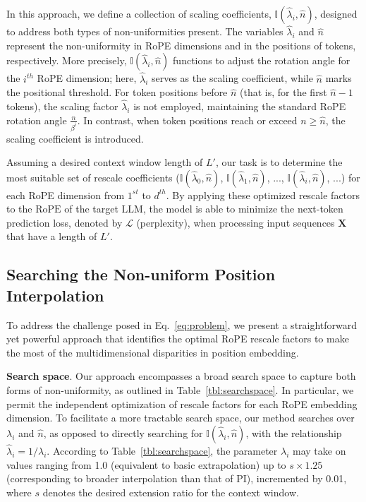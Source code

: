 In this approach, we define a collection of scaling coefficients, $\mathbb{I}(\hat{\lambda}_{i},\hat{n})$, designed to address both types of non-uniformities present. The variables $\hat{\lambda}_{i}$ and $\hat{n}$ represent the non-uniformity in RoPE dimensions and in the positions of tokens, respectively. More precisely, $\mathbb{I}(\hat{\lambda}_{i},\hat{n})$ functions to adjust the rotation angle for the $i^{th}$ RoPE dimension; here, $\hat\lambda_{i}$ serves as the scaling coefficient, while $\hat{n}$ marks the positional threshold. For token positions before $\hat{n}$ (that is, for the first $\hat{n}-1$ tokens), the scaling factor $\hat\lambda_{i}$ is not employed, maintaining the standard RoPE rotation angle $\frac{n}{\beta^i}$. In contrast, when token positions reach or exceed $n\ge\hat{n}$, the scaling coefficient is introduced.

Assuming a desired context window length of $L'$, our task is to determine the most suitable set of rescale coefficients ($\mathbb{I}(\hat{\lambda}_{0},\hat{n})$, $\mathbb{I}(\hat{\lambda}_{1},\hat{n})$, ..., $\mathbb{I}(\hat{\lambda}_{i},\hat{n})$, ...) for each RoPE dimension from $1^{st}$ to $d^{th}$. By applying these optimized rescale factors to the $\text{RoPE}$ of the target $\text{LLM}$, the model is able to minimize the next-token prediction loss, denoted by $\mathcal{L}$ (perplexity), when processing input sequences $\mathbf{X}$ that have a length of $L'$.

\subsection{Searching the Non-uniform Position Interpolation}

To address the challenge posed in Eq.~\ref{eq:problem}, we present a straightforward yet powerful approach that identifies the optimal RoPE rescale factors to make the most of the multidimensional disparities in position embedding.

\textbf{Search space}. Our approach encompasses a broad search space to capture both forms of non-uniformity, as outlined in Table~\ref{tbl:searchspace}. In particular, we permit the independent optimization of rescale factors for each RoPE embedding dimension. To facilitate a more tractable search space, our method searches over $\lambda_i$ and $\hat{n}$, as opposed to directly searching for $\mathbb{I}(\hat{\lambda}_{i},\hat{n})$, with the relationship $\hat{\lambda}_{i}=1/\lambda_i$. According to Table~\ref{tbl:searchspace}, the parameter $\lambda_i$ may take on values ranging from 1.0 (equivalent to basic extrapolation) up to $s\times1.25$ (corresponding to broader interpolation than that of PI), incremented by 0.01, where $s$ denotes the desired extension ratio for the context window.

